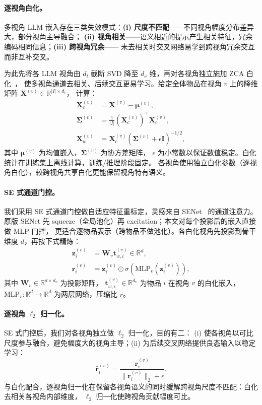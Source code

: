 \documentclass[sigconf,natbib=true,anonymous]{acmart}
\newcommand{\llm}{\textsc{LLM}\xspace}
\newcommand{\slashbreak}{/\allowbreak{}}
\begin{document}
\paragraph{逐视角白化。}
多视角 \llm 嵌入存在三类失效模式：\textbf{(i) 尺度不匹配}——不同视角幅度分布差异大，部分视角主导融合；
\textbf{(ii) 视角相关}——语义相近的提示产生相关特征，冗余编码相同信息；\textbf{(iii) 跨视角冗余}——
未去相关时交叉网络易学到跨视角冗余交互而非互补交叉。

为此先将各 \llm 视角由 $d_l$ 截断 SVD 降至 $d_v$ 维，再对各视角独立施加 ZCA 白化~\cite{kessy2018zca}，
使多视角通道去相关、后续交互更易学习。给定全体物品在视角 $v$ 上的降维矩阵 $\mathbf{X}^{(v)} \in \mathbb{R}^{|I| \times d_v}$，
计算：
\begin{align}
  \mathbf{X}_c^{(v)} &= \mathbf{X}^{(v)} - \boldsymbol{\mu}^{(v)}, \\
  \boldsymbol{\Sigma}^{(v)} &= \frac{1}{|I|}(\mathbf{X}_c^{(v)})^\top \mathbf{X}_c^{(v)}, \\
  \mathbf{X}_w^{(v)} &= \mathbf{X}_c^{(v)} (\boldsymbol{\Sigma}^{(v)} + \epsilon \mathbf{I})^{-1/2},
\end{align}
其中 $\boldsymbol{\mu}^{(v)}$ 为均值嵌入，$\boldsymbol{\Sigma}^{(v)}$ 为协方差矩阵，
$\epsilon$ 为小常数以保证数值稳定。白化统计在训练集上离线计算，训练\slashbreak{}推理阶段固定。
各视角使用独立白化参数（逐视角白化），较跨视角共享白化更能保留视角特有语义。

\paragraph{SE 式通道门控。}
我们采用 SE 式通道门控做自适应特征重标定，灵感来自 SENet~\cite{hu2018senet} 的通道注意力。
原版 SENet 先 squeeze（全局池化）再 excitation；本文对每个投影后的嵌入直接做 MLP 门控，
更适合逐物品表示（跨物品不做池化）。各白化视角先投影到骨干维度 $d$，再按下式精炼：
\begin{align}
  \mathbf{z}_i^{(v)} &= \mathbf{W}_v \mathbf{t}_{w,i}^{(v)} \in \mathbb{R}^d,\\
  \mathbf{r}_i^{(v)} &= \mathbf{z}_i^{(v)} \odot \sigma(\mathrm{MLP}_v(\mathbf{z}_i^{(v)})),
\end{align}
其中 $\mathbf{W}_v \in \mathbb{R}^{d \times d_v}$ 为投影矩阵，
$\mathbf{t}_{w,i}^{(v)} \in \mathbb{R}^{d_v}$ 为物品 $i$ 在视角 $v$ 的白化嵌入，
$\mathrm{MLP}_v: \mathbb{R}^d \to \mathbb{R}^d$ 为两层网络，压缩比 $r$。

\paragraph{逐视角 $\ell_2$ 归一化。}
SE 式门控后，我们对各视角独立做 $\ell_2$ 归一化，目的有二：
(i) 使各视角以可比尺度参与融合，避免幅度大的视角主导；(ii) 为后续交叉网络提供良态输入以稳定学习：
\begin{equation}
  \hat{\mathbf{r}}_i^{(v)} = \frac{\mathbf{r}_i^{(v)}}{\lVert \mathbf{r}_i^{(v)} \rVert_2 + \epsilon}.
\end{equation}
与白化配合，逐视角归一化在保留各视角语义的同时缓解跨视角尺度不匹配：白化去相关各视角内部维度，
$\ell_2$ 归一化使跨视角贡献幅度可比。
\end{document}
